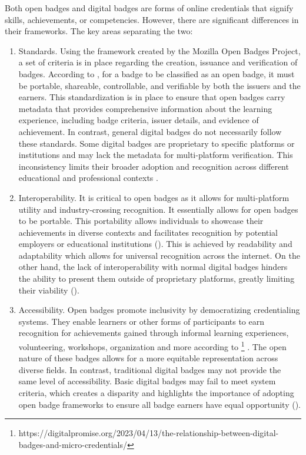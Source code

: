 %
Both open badges and digital badges are forms of online credentials that signify skills, achievements, or competencies. 
However, there are significant differences in their frameworks. The key areas separating the two:
\begin{enumerate}
    \addtolength{\itemsep}{-0.5\baselineskip} 
  \item {Standards.} Using the framework created by the Mozilla Open Badges Project, a set of criteria is in place regarding the creation, issuance and verification of badges. 
  According to \textcite{whatIsAnOpenBadge}, for a badge to be classified as an open badge, it must be portable, shareable, controllable, and verifiable by both the issuers and the earners. 
  This standardization is in place to ensure that open badges carry metadata that provides comprehensive information about the learning experience, including badge criteria, issuer details, and evidence of achievement. 
  In contrast, general digital badges do not necessarily follow these standards. 
  Some digital badges are proprietary to specific platforms or institutions and may lack the metadata for multi-platform verification. 
  This inconsistency limits their broader adoption and recognition across different educational and professional contexts \textcite{areBadgesUseful}.
  \item {Interoperability.} It is critical to open badges as it allows for multi-platform utility and industry-crossing recognition. 
  It essentially allows for open badges to be portable. This portability allows individuals to showcase their achievements in diverse contexts and facilitates recognition by potential employers or educational institutions (\cite{credentialsBadges}). 
  This is achieved by readability and adaptability which allows for universal recognition across the internet. 
  On the other hand, the lack of interoperability with normal digital badges hinders the ability to present them outside of proprietary platforms, greatly limiting their viability (\cite{areBadgesUseful}).
  \item {Accessibility.} Open badges promote inclusivity by democratizing credentialing systems. 
  They enable learners or other forms of participants to earn recognition for achievements gained through informal learning experiences, volunteering, workshops, organization and more according to \footnote{https://digitalpromise.org/2023/04/13/the-relationship-between-digital-badges-and-micro-credentials/} \textcite{credentialsBadges}. 
  The open nature of these badges allows for a more equitable representation across diverse fields. 
  In contrast, traditional digital badges may not provide the same level of accessibility. Basic digital badges may fail to meet system criteria, which creates a disparity and highlights the importance of adopting open badge frameworks to ensure all badge earners have equal opportunity (\cite {whatIsAnOpenBadge}). 
\end{enumerate}

